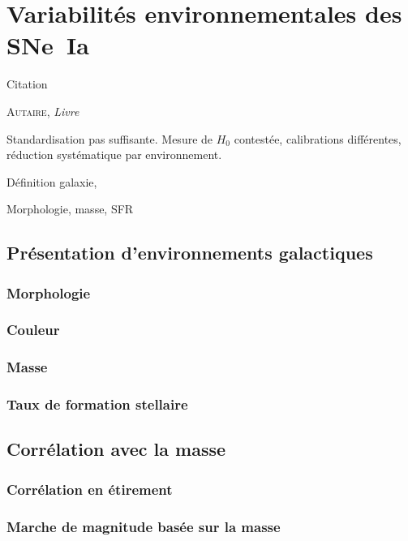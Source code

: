 \documentclass[../main/main.tex]{subfiles}
\begin{document}

\chapter{Variabilit\'es environnementales des SNe~Ia}\label{ch:env}
\epigraph{\openquote Citation\closequote}{\textsc{Autaire}, \textit{Livre}}

Standardisation pas suffisante. Mesure de $H_0$ contestée, calibrations
différentes, réduction systématique par environnement.

Définition galaxie,

Morphologie, masse, SFR

\vfill
\minitoc
\vfill
\newpage

\section{Présentation d'environnements galactiques}\label{sec:envpres}
\subsection{Morphologie}\label{ssec:morphost}
\subsection{Couleur}\label{ssec:chost}
\subsection{Masse}\label{ssec:mhost}
\subsection{Taux de formation stellaire}\label{ssc:sfrhost}

\section{Corrélation avec la masse}\label{ssec:mcorr}
\subsection{Corrélation en étirement}\label{sssec:mcorrx1}
\subsection{Marche de magnitude basée sur la masse}\label{sssec:mstep}
\end{document}
